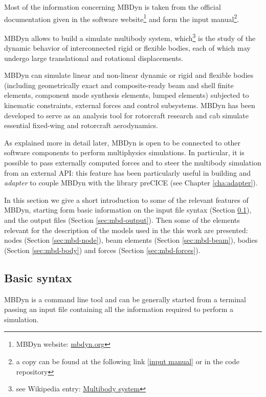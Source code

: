 Most of the information concerning MBDyn is taken from the official documentation given in the software website\footnote{MBDyn website: \href{https://www.mbdyn.org/}{mbdyn.org}} and form the input manual\footnote{a copy can be found at the following link [\href{https://www.mbdyn.org/userfiles/documents/mbdyn-input-1.7.3.pdf}{input manual}] or in the code repository}.

MBDyn allows to build a simulate multibody system, which\footnote{see Wikipedia entry: \href{https://en.wikipedia.org/wiki/Multibody_system}{Multibody system}} is the study of the dynamic behavior of interconnected rigid or flexible bodies, each of which may undergo large translational and rotational displacements.

MBDyn can simulate linear and non-linear dynamic or rigid and flexible bodies (including geometrically exact and composite-ready beam and shell finite elements, component mode synthesis elements, lumped elements) subjected to kinematic constraints, external forces and control subsystems\cite{masarati2014efficient}. 
MBDyn has been developed to serve as an analysis tool for rotorcraft research and cab simulate essential fixed-wing and rotorcraft aerodynamics.

As explained more in detail later, MBDyn is open to be connected to other software components to perform multiphysics simulations. In particular, it is possible to pass externally computed forces  and to steer the multibody simulation from an external API: this feature has been particularly useful in building and \textit{adapter} to couple MBDyn with the library preCICE (see Chapter \ref{cha:adapter}).

In this section we give a short introduction to some of the relevant features of MBDyn, starting form basic information on the input file syntax (Section \ref{sec:mbd-syntax}), and the output files (Section \ref{sec:mbd-output}). Then some of the elements relevant for the description of the models used in the this work are presented: nodes (Section \ref{sec:mbd-node}), beam elements (Section \ref{sec:mbd-beam}), bodies (Section \ref{sec:mbd-body}) and forces (Section \ref{sec:mbd-forces}). 


\subsection{Basic syntax}
\label{sec:mbd-syntax}

MBDyn is a command line tool and can be generally started from a terminal passing an input file containing all the information required to perform a simulation. 

